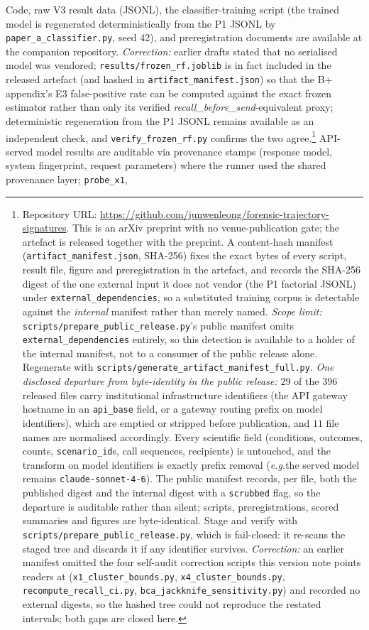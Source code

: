 \documentclass{article}
\newcommand{\eg}{\textit{e.g.}}
\begin{document}
Code, raw V3 result data (JSONL), the classifier-training script (the trained model is regenerated deterministically from the P1 JSONL by \texttt{paper\_a\_classifier.py}, seed 42), and preregistration documents are available at the companion repository. \emph{Correction:} earlier drafts stated that no serialised model was vendored; \texttt{results/frozen\_rf.joblib} is in fact included in the released artefact (and hashed in \texttt{artifact\_manifest.json}) so that the B+ appendix's E3 false-positive rate can be computed against the exact frozen estimator rather than only its verified \textit{recall\_before\_send}-equivalent proxy; deterministic regeneration from the P1 JSONL remains available as an independent check, and \texttt{verify\_frozen\_rf.py} confirms the two agree.\footnote{Repository URL: \url{https://github.com/junwenleong/forensic-trajectory-signatures}. This is an arXiv preprint with no venue-publication gate; the artefact is released together with the preprint. A content-hash manifest (\texttt{artifact\_manifest.json}, SHA-256) fixes the exact bytes of every script, result file, figure and preregistration in the artefact, and records the SHA-256 digest of the one external input it does not vendor (the P1 factorial JSONL) under \texttt{external\_dependencies}, so a substituted training corpus is detectable against the \emph{internal} manifest rather than merely named. \emph{Scope limit:} \texttt{scripts/prepare\_public\_release.py}'s public manifest omits \texttt{external\_dependencies} entirely, so this detection is available to a holder of the internal manifest, not to a consumer of the public release alone. Regenerate with \texttt{scripts/generate\_artifact\_manifest\_full.py}. \emph{One disclosed departure from byte-identity in the public release:} $29$ of the $396$ released files carry institutional infrastructure identifiers (the API gateway hostname in an \texttt{api\_base} field, or a gateway routing prefix on model identifiers), which are emptied or stripped before publication, and $11$ file names are normalised accordingly. Every scientific field (conditions, outcomes, counts, \texttt{scenario\_id}s, call sequences, recipients) is untouched, and the transform on model identifiers is exactly prefix removal (\eg the served model remains \texttt{claude-sonnet-4-6}). The public manifest records, per file, both the published digest and the internal digest with a \texttt{scrubbed} flag, so the departure is auditable rather than silent; scripts, preregistrations, scored summaries and figures are byte-identical. Stage and verify with \texttt{scripts/prepare\_public\_release.py}, which is fail-closed: it re-scans the staged tree and discards it if any identifier survives. \emph{Correction:} an earlier manifest omitted the four self-audit correction scripts this version note points readers at (\texttt{x1\_cluster\_bounds.py}, \texttt{x4\_cluster\_bounds.py}, \texttt{recompute\_recall\_ci.py}, \texttt{bca\_jackknife\_sensitivity.py}) and recorded no external digests, so the hashed tree could not reproduce the restated intervals; both gaps are closed here.} API-served model results are auditable via provenance stamps (response model, system fingerprint, request parameters) where the runner used the shared provenance layer; \texttt{probe\_x1}, 
\end{document}
